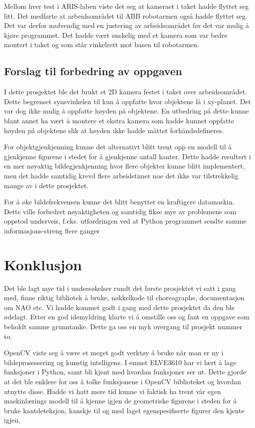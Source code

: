 \documentclass[conference]{IEEEtran}
\begin{document}
        Mellom hver test i ARIS-laben viste det seg at kameraet i taket hadde flyttet seg litt. Det medførte at arbeidsområdet til ABB robotarmen også 
        hadde flyttet seg. Det var derfor nødvendig med en justering av arbeidsområdet før det var mulig å kjøre programmet. Det hadde vært ønskelig med 
        et kamera som var bedre montert i taket og som står vinkelrett mot basen til robotarmen.

    \subsection{Forslag til forbedring av oppgaven}
        I dette prosjektet ble det brukt et 2D kamera festet i taket over arbeidsområdet. Dette begrenset synsvinkelen til kun å oppfatte hvor objektene 
        lå i xy-planet. Det var dog ikke mulig å oppfatte høyden på objektene. En utbedring på dette kunne blant annet ha vært å montere et ekstra kamera 
        som hadde kunnet oppfatte høyden på objektene slik at høyden ikke hadde måttet forhåndsdefineres. 

        For objektgjenkjenning kunne det alternativt blitt trent opp en modell til å gjenkjenne figurene i stedet for å gjenkjenne antall kanter. Dette 
        hadde resultert i en mer nøyaktig bildegjenkjenning hvor flere objekter kunne blitt implementert, men det hadde samtidig krevd flere arbeidstimer 
        noe det ikke var tilstrekkelig mange av i dette prosjektet.  

        For å øke bildefrekvensen kunne det blitt benyttet en kraftigere datamaskin. Dette ville forbedret nøyaktigheten og samtidig fikse mye av 
        problemene som oppstod underveis, f.eks. utfordringen ved at Python programmet sendte samme informasjons-streng flere ganger

    
\section{Konklusjon}
    Det ble lagt mye tid i undersøkelser rundt det første prosjektet vi satt i gang med, finne riktig bibliotek å bruke, nøkkelkode til choreagraphe, 
    documentasjon om NAO etc. Vi hadde kommet godt i gang med dette prosjektet da den ble ødelagt. Etter en god idemyldring klarte vi å omstille 
    oss og fant en oppgave som beholdt samme grunntanke. Dette ga oss en myk overgang til prosjekt nummer to.

    OpenCV viste seg å være et meget godt verktøy å bruke når man er ny i bildeprosessering og kunstig intelligens. I emnet ELVE3610 har vi lært 
    å lage funksjoner i Python, samt bli kjent med hvordan funksjoner ser ut. Dette gjorde at det ble enklere for oss å tolke funksjonene i OpenCV 
    biblioteket og hvordan utnytte disse. Hadde vi hatt mere tid kunne vi faktisk ha trent vår egen maskinlærings modell til å kjenne igjen de 
    geometriske figurene i steden for å bruke kantdeteksjon, kanskje til og med laget egenspesifiserte figurer den kjente igjen. 
\end{document}
